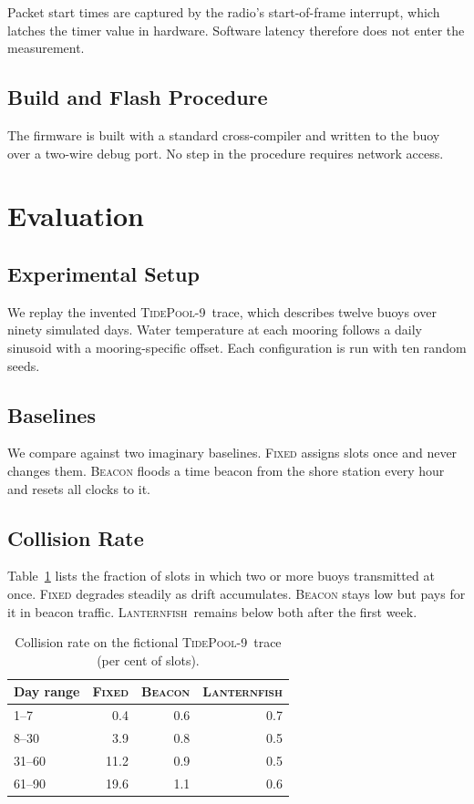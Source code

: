 \documentclass[conference]{IEEEtran}
\newcommand{\sysname}{\textsc{Lanternfish}}
\newcommand{\dataset}{\textsc{TidePool-9}}
\begin{document}
Packet start times are captured by the radio's start-of-frame interrupt, which
latches the timer value in hardware. Software latency therefore does not enter
the measurement.

\subsection*{Build and Flash Procedure}

The firmware is built with a standard cross-compiler and written to the buoy
over a two-wire debug port. No step in the procedure requires network access.

\section{Evaluation}
\label{sec:eval}

\subsection{Experimental Setup}
\label{sec:eval-setup}

We replay the invented \dataset\ trace, which describes twelve buoys over
ninety simulated days. Water temperature at each mooring follows a daily
sinusoid with a mooring-specific offset. Each configuration is run with ten
random seeds.

\subsection{Baselines}
\label{sec:eval-baselines}

We compare against two imaginary baselines. \textsc{Fixed} assigns slots once
and never changes them. \textsc{Beacon} floods a time beacon from the shore
station every hour and resets all clocks to it.

\subsection{Collision Rate}
\label{sec:eval-collisions}

Table~\ref{tab:collisions} lists the fraction of slots in which two or more
buoys transmitted at once. \textsc{Fixed} degrades steadily as drift
accumulates. \textsc{Beacon} stays low but pays for it in beacon traffic.
\sysname\ remains below both after the first week.

\begin{table}[t]
  \caption{Collision rate on the fictional \dataset\ trace (per cent of slots).}
  \label{tab:collisions}
  \centering
  \begin{tabular}{lrrr}
    \toprule
    Day range & \textsc{Fixed} & \textsc{Beacon} & \sysname \\
    \midrule
    1--7 & 0.4 & 0.6 & 0.7 \\
    8--30 & 3.9 & 0.8 & 0.5 \\
    31--60 & 11.2 & 0.9 & 0.5 \\
    61--90 & 19.6 & 1.1 & 0.6 \\
    \bottomrule
  \end{tabular}
\end{table}
\end{document}

